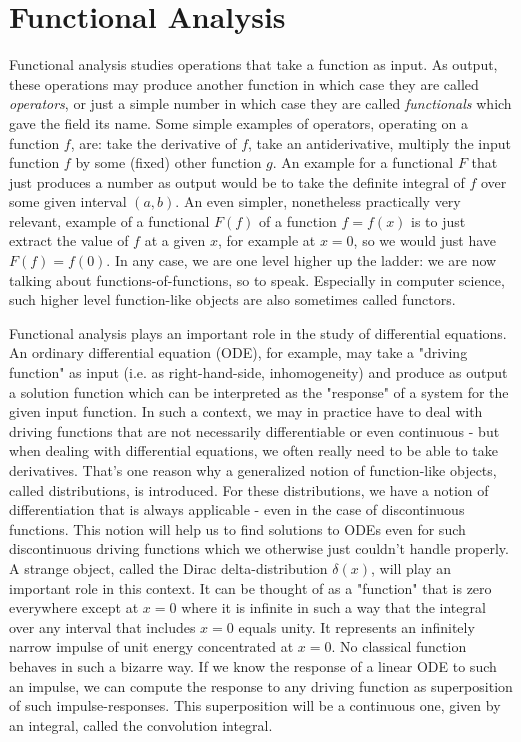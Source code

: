 \chapter{Functional Analysis}
Functional analysis studies operations that take a function as input. As output, these operations may produce another function in which case they are called \emph{operators}, or just a simple number in which case they are called \emph{functionals} which gave the field its name. Some simple examples of operators, operating on a function $f$, are: take the derivative of $f$, take an antiderivative, multiply the input function $f$ by some (fixed) other function $g$. An example for a functional $F$ that just produces a number as output would be to take the definite integral of $f$ over some given interval $(a,b)$. An even simpler, nonetheless practically very relevant, example of a functional $F(f)$ of a function $f = f(x)$ is to just extract the value of $f$ at a given $x$, for example at $x=0$, so we would just have $F(f) = f(0)$. In any case, we are one level higher up the ladder: we are now talking about functions-of-functions, so to speak. Especially in computer science, such higher level function-like objects are also sometimes called functors. 

\medskip
Functional analysis plays an important role in the study of differential equations. An ordinary differential equation (ODE), for example, may take a "driving function" as input (i.e. as right-hand-side, inhomogeneity) and produce as output a solution function which can be interpreted as the "response" of a system for the given input function. In such a context, we may in practice have to deal with driving functions that are not necessarily differentiable or even continuous - but when dealing with differential equations, we often really need to be able to take derivatives. That's one reason why a generalized notion of function-like objects, called distributions, is introduced. For these distributions, we have a notion of differentiation that is always applicable - even in the case of discontinuous functions. This notion will help us to find solutions to ODEs even for such discontinuous driving functions which we otherwise just couldn't handle properly. A strange object, called the Dirac delta-distribution $\delta(x)$, will play an important role in this context. It can be thought of as a "function" that is zero everywhere except at $x=0$ where it is infinite in such a way that the integral over any interval that includes $x=0$ equals unity. It represents an infinitely narrow impulse of unit energy concentrated at $x=0$. No classical function behaves in such a bizarre way. If we know the response of a linear ODE to such an impulse, we can compute the response to any driving function as superposition of such impulse-responses. This superposition will be a continuous one, given by an integral, called the convolution integral.


